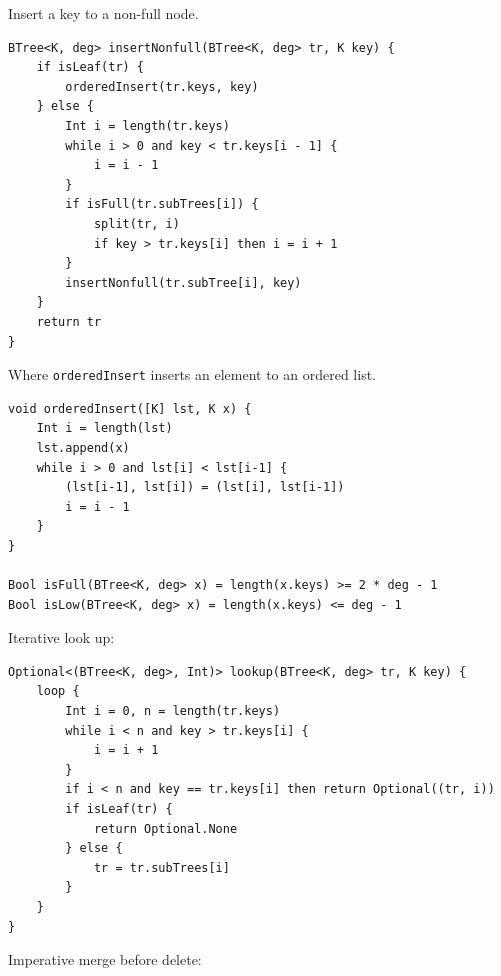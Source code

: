 \documentclass[b5paper]{article}
\begin{document}
Insert a key to a non-full node.

\begin{lstlisting}[language = Bourbaki]
BTree<K, deg> insertNonfull(BTree<K, deg> tr, K key) {
    if isLeaf(tr) {
        orderedInsert(tr.keys, key)
    } else {
        Int i = length(tr.keys)
        while i > 0 and key < tr.keys[i - 1] {
            i = i - 1
        }
        if isFull(tr.subTrees[i]) {
            split(tr, i)
            if key > tr.keys[i] then i = i + 1
        }
        insertNonfull(tr.subTree[i], key)
    }
    return tr
}
\end{lstlisting}

Where \texttt{orderedInsert} inserts an element to an ordered list.

\begin{lstlisting}[language = Bourbaki]
void orderedInsert([K] lst, K x) {
    Int i = length(lst)
    lst.append(x)
    while i > 0 and lst[i] < lst[i-1] {
        (lst[i-1], lst[i]) = (lst[i], lst[i-1])
        i = i - 1
    }
}

Bool isFull(BTree<K, deg> x) = length(x.keys) >= 2 * deg - 1
Bool isLow(BTree<K, deg> x) = length(x.keys) <= deg - 1
\end{lstlisting}

Iterative look up:

\begin{lstlisting}[language = Bourbaki]
Optional<(BTree<K, deg>, Int)> lookup(BTree<K, deg> tr, K key) {
    loop {
        Int i = 0, n = length(tr.keys)
        while i < n and key > tr.keys[i] {
            i = i + 1
        }
        if i < n and key == tr.keys[i] then return Optional((tr, i))
        if isLeaf(tr) {
            return Optional.None
        } else {
            tr = tr.subTrees[i]
        }
    }
}
\end{lstlisting}

Imperative merge before delete:
\end{document}
